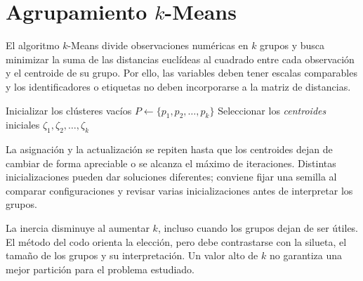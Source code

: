 \documentclass[a4,11pt]{aleph-notas}
\begin{document}
\encabezado

\section{Agrupamiento $k$-Means}

El algoritmo $k$-Means divide observaciones numéricas en $k$ grupos y busca minimizar la suma de las distancias euclídeas al cuadrado entre cada observación y el centroide de su grupo. Por ello, las variables deben tener escalas comparables y los identificadores o etiquetas no deben incorporarse a la matriz de distancias.

\begin{algorithm}[H]
    \caption{Pseudocódigo del algoritmo $k$-means}


    Inicializar los clústeres vacíos $P \leftarrow \{p_1, p_2, \dots, p_k\}$\;
    Seleccionar los \emph{centroides} iniciales $\zeta_1, \zeta_2, \dots, \zeta_k$\;
    
\end{algorithm}

La asignación y la actualización se repiten hasta que los centroides dejan de cambiar de forma apreciable o se alcanza el máximo de iteraciones. Distintas inicializaciones pueden dar soluciones diferentes; conviene fijar una semilla al comparar configuraciones y revisar varias inicializaciones antes de interpretar los grupos.

La inercia disminuye al aumentar $k$, incluso cuando los grupos dejan de ser útiles. El método del codo orienta la elección, pero debe contrastarse con la silueta, el tamaño de los grupos y su interpretación. Un valor alto de $k$ no garantiza una mejor partición para el problema estudiado.
\end{document}
